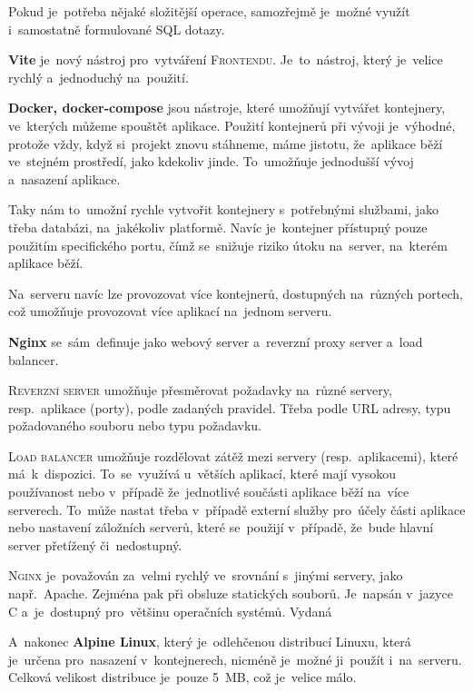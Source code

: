 \documentclass[14pt,a4paper]{article}
\begin{document}
            Pokud je~potřeba nějaké složitější operace, samozřejmě je~možné využít i~samostatně formulované SQL dotazy. \parencite{gormGORM}

            \textbf{Vite} je~nový nástroj pro~vytváření \textsc{Frontendu}. Je~to~nástroj, který je~velice rychlý a~jednoduchý na~použití.

            \textbf{Docker, docker-compose} jsou nástroje, které umožňují vytvářet kontejnery, ve~kterých můžeme spouštět aplikace.
            Použití kontejnerů při vývoji je~výhodné, protože vždy, když si~projekt znovu stáhneme, máme jistotu, že~aplikace běží
            ve~stejném prostředí, jako kdekoliv jinde. To~umožňuje jednodušší vývoj a~nasazení aplikace.

            Taky nám to~umožní rychle vytvořit kontejnery s~potřebnými službami, jako třeba databázi, na~jakékoliv platformě. Navíc je~kontejner přístupný pouze použitím specifického portu,
            čímž se~snižuje riziko útoku na~server, na~kterém aplikace běží. \parencite{docker}

            Na~serveru navíc lze provozovat více kontejnerů, dostupných na~různých portech, což umožňuje provozovat více aplikací na~jednom serveru.

            \textbf{Nginx} se~sám~definuje jako webový server a~reverzní proxy server a~load balancer.

            \textsc{Reverzní server} umožňuje přesměrovat požadavky na~různé servery, resp.~aplikace (porty), podle zadaných pravidel. Třeba podle URL adresy, typu požadovaného souboru nebo typu požadavku.
            
            \textsc{Load balancer} umožňuje rozdělovat zátěž mezi servery (resp.~aplikacemi), které má~k~dispozici. To~se~využívá u~větších aplikací, které mají vysokou používanost nebo v~případě že~jednotlivé součásti aplikace běží na~více serverech. To~může nastat třeba v~případě externí služby pro~účely části aplikace nebo nastavení záložních serverů, které se~použijí v~případě, že~bude hlavní server přetížený či~nedostupný.
            
            \textsc{Nginx} je~považován za~velmi rychlý ve~srovnání s~jinými servery, jako např.~Apache. Zejména pak při obsluze statických souborů. Je~napsán v~jazyce C a~je~dostupný pro~většinu operačních systémů. Vydaná  \parencite{WhatNGINX}

            A~nakonec \textbf{Alpine Linux}, který je~odlehčenou distribucí Linuxu, která je~určena pro~nasazení v~kontejnerech, nicméně je~možné ji~použít i~na~serveru. Celková velikost distribuce je~pouze 5~MB, což je~velice málo. 
\end{document}
